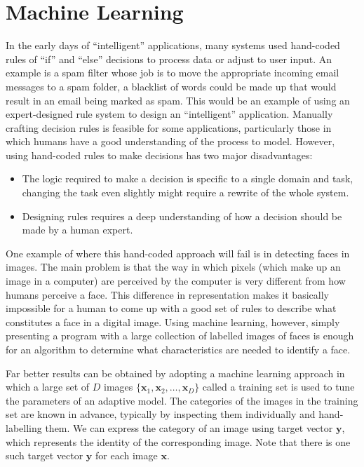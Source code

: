 \documentclass[12pt]{report}
\numberwithin{equation}{section}
\begin{document}
\section{Machine Learning}
In the early days of ``intelligent'' applications, many systems used hand-coded rules of ``if'' and ``else'' decisions to process data or adjust to user input. An example is a spam filter whose job is to move the appropriate incoming email messages to a spam folder, a blacklist of words could be made up that would result in an email being marked as spam. This would be an example of using an expert-designed rule system to design an ``intelligent'' application. Manually crafting decision rules is feasible for some applications, particularly those in which humans have a good understanding of the process to model. However, using hand-coded rules to make decisions has two major disadvantages:
\begin{itemize}
\item The logic required to make a decision is specific to a single domain and task, changing the task even slightly might require a rewrite of the whole system.
\item Designing rules requires a deep understanding of how a decision should be made
by a human expert.
\end{itemize}
One example of where this hand-coded approach will fail is in detecting faces in images. The main problem is that the way in which pixels (which make up an image in a computer) are perceived by the computer is very different from how humans perceive a face. This difference in representation makes it basically impossible for a human to come up with a good set of rules to describe what constitutes a face in a digital image. Using machine learning, however, simply presenting a program with a large collection of labelled images of faces is enough for an algorithm to determine what characteristics are needed to identify a face.

Far better results can be obtained by adopting a machine learning approach in which a large set of $D$ images $\{\bm{x}_1, \bm{x}_2, \hdots , \bm{x}_D\}$ called a {training set} is used to tune the parameters of an adaptive model. The categories of the images in the training set are known in advance, typically by inspecting them individually and hand-labelling them. We can express the category of an image using {target vector} $\bm{y}$, which represents the identity of the corresponding image. Note that there is one such target vector $\bm{y}$ for each  image $\bm{x}$.
\end{document}
